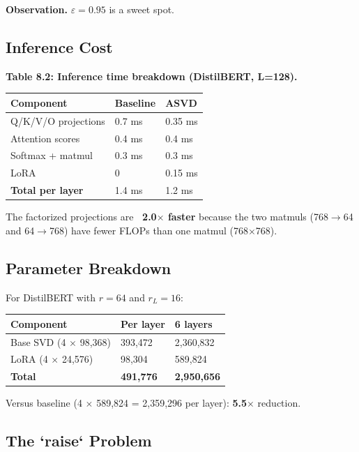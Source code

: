 \textbf{Observation.} $\varepsilon = 0.95$ is a sweet spot.

\subsection{Inference Cost}

\textbf{Table 8.2: Inference time breakdown (DistilBERT, L=128).}

\begin{table}[H]
\centering
\small
\begin{tabular}{lll}
\toprule
\textbf{Component} & \textbf{Baseline} & \textbf{ASVD} \\
\midrule
Q/K/V/O projections & 0.7 ms & 0.35 ms \\
Attention scores & 0.4 ms & 0.4 ms \\
Softmax + matmul & 0.3 ms & 0.3 ms \\
LoRA & 0 & 0.15 ms \\
\textbf{Total per layer} & 1.4 ms & 1.2 ms \\
\bottomrule
\end{tabular}
\end{table}

The factorized projections are \textbf{~2.0$\times$ faster} because 
the two matmuls (768$\to$64 and 64$\to$768) have fewer FLOPs than one matmul 
(768$\times$768).

\subsection{Parameter Breakdown}

For DistilBERT with $r = 64$ and $r_L = 16$:

\begin{table}[H]
\centering
\small
\begin{tabular}{lll}
\toprule
\textbf{Component} & \textbf{Per layer} & \textbf{6 layers} \\
\midrule
Base SVD (4 $\times$ 98,368) & 393,472 & 2,360,832 \\
LoRA (4 $\times$ 24,576) & 98,304 & 589,824 \\
\textbf{Total} & \textbf{491,776} & \textbf{2,950,656} \\
\bottomrule
\end{tabular}
\end{table}

Versus baseline (4 $\times$ 589,824 = 2,359,296 per layer): \textbf{5.5$\times$} 
reduction.

\subsection{The `raise` Problem}

